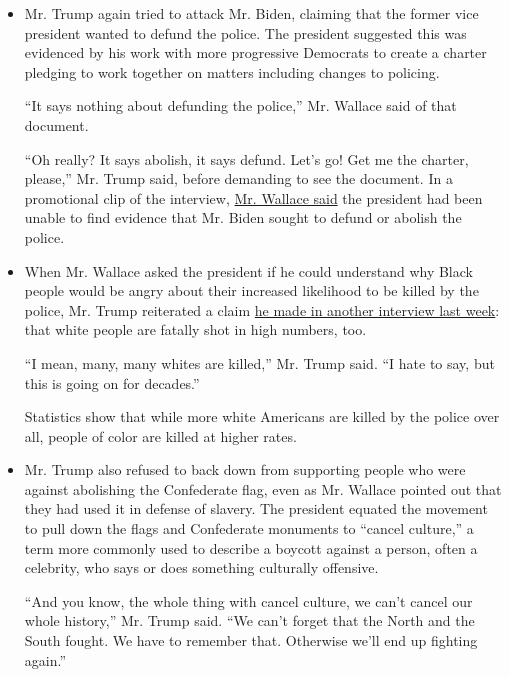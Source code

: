 \begin{itemize}
\item
  Mr. Trump again tried to attack Mr. Biden, claiming that the former
  vice president wanted to defund the police. The president suggested
  this was evidenced by his work with more progressive Democrats to
  create a charter pledging to work together on matters including
  changes to policing.

  ``It says nothing about defunding the police,'' Mr. Wallace said of
  that document.

  ``Oh really? It says abolish, it says defund. Let's go! Get me the
  charter, please,'' Mr. Trump said, before demanding to see the
  document. In a promotional clip of the interview,
  \href{https://www.usatoday.com/story/news/politics/2020/07/17/fox-news-chris-wallace-fact-checks-trump-bidens-stance-police/5461970002/}{Mr.
  Wallace said} the president had been unable to find evidence that Mr.
  Biden sought to defund or abolish the police.
\item
  When Mr. Wallace asked the president if he could understand why Black
  people would be angry about their increased likelihood to be killed by
  the police, Mr. Trump reiterated a claim
  \href{https://www.nytimes3xbfgragh.onion/2020/07/14/us/politics/trump-white-people-killed-by-police.html}{he
  made in another interview last week}: that white people are fatally
  shot in high numbers, too.

  ``I mean, many, many whites are killed,'' Mr. Trump said. ``I hate to
  say, but this is going on for decades.''

  Statistics show that while more white Americans are killed by the
  police over all, people of color are killed at higher rates.
\item
  Mr. Trump also refused to back down from supporting people who were
  against abolishing the Confederate flag, even as Mr. Wallace pointed
  out that they had used it in defense of slavery. The president equated
  the movement to pull down the flags and Confederate monuments to
  ``cancel culture,'' a term more commonly used to describe a boycott
  against a person, often a celebrity, who says or does something
  culturally offensive.

  ``And you know, the whole thing with cancel culture, we can't cancel
  our whole history,'' Mr. Trump said. ``We can't forget that the North
  and the South fought. We have to remember that. Otherwise we'll end up
  fighting again.''
\end{itemize}

